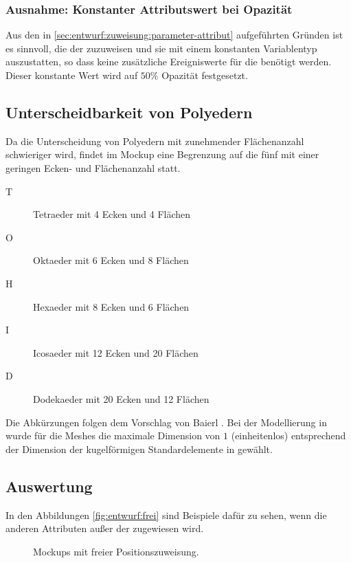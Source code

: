 \subsubsection{Ausnahme: Konstanter Attributswert bei Opazität}

Aus den in \autoref{sec:entwurf:zuweisung:parameter-attribut} aufgeführten Gründen ist es sinnvoll, die  der  zuzuweisen und sie mit einem konstanten Variablentyp auszustatten, so dass keine zusätzliche Ereigniswerte für die  benötigt werden. Dieser konstante Wert wird auf $50\%$ Opazität festgesetzt.

\subsection{Unterscheidbarkeit von Polyedern}

Da die Unterscheidung von Polyedern mit zunehmender Flächenanzahl schwieriger wird, findet im Mockup eine Begrenzung auf die fünf  mit einer geringen Ecken- und Flächenanzahl statt.
\begin{description}
	\item[T] Tetraeder mit 4 Ecken und 4 Flächen
	\item[O] Oktaeder mit 6 Ecken und 8 Flächen
	\item[H] Hexaeder mit 8 Ecken und 6 Flächen
	\item[I] Icosaeder mit 12 Ecken und 20 Flächen
	\item[D] Dodekaeder mit 20 Ecken und 12 Flächen
\end{description}
Die Abkürzungen folgen dem Vorschlag von Baierl \cite[S.~42]{KonvexePolyeder}. Bei der Modellierung in  wurde für die Meshes die maximale Dimension von $1$ (einheitenlos) entsprechend der Dimension der kugelförmigen Standardelemente in  gewählt.


\subsection{Auswertung}%

In den Abbildungen \autoref{fig:entwurf:frei} sind Beispiele dafür zu sehen, wenn die  anderen Attributen außer der  zugewiesen wird.

\begin{figure}
	\caption{Mockups mit freier Positionszuweisung.}\label{fig:entwurf:frei}
\end{figure}

